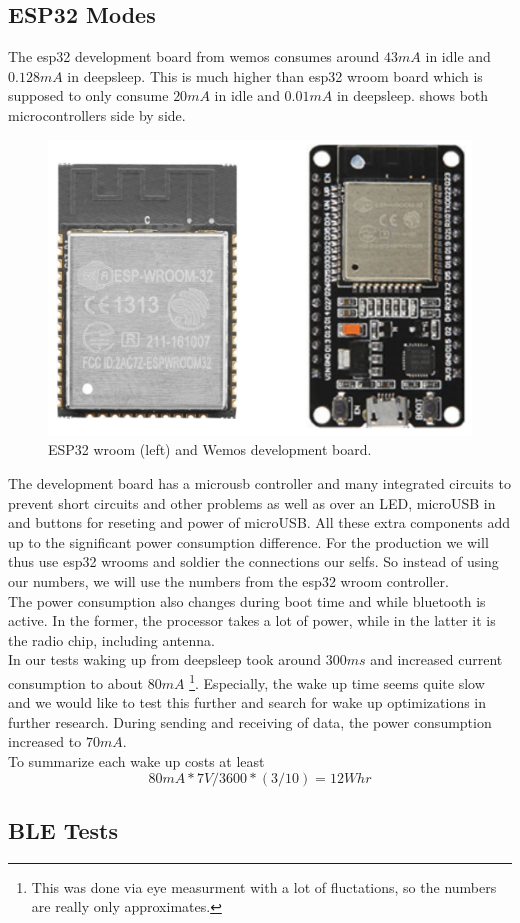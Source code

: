 \subsection{ESP32 Modes}
The esp32 development board from wemos consumes around $43mA$ in idle and $0.128mA$ in deepsleep. This is much higher than esp32 wroom board which is supposed to only consume $20mA$ in idle and $0.01mA$ in deepsleep\cite{InsightI15esp32ModesWroom:online}.  shows both microcontrollers side by side. 

\begin{figure}[H!]
    \centering
    \includegraphics[scale=0.4]{figures/esp32-wroom-wemos.png}%
    \caption{ESP32 wroom (left) and Wemos development board.}\label{fig:esp32Comp}
\end{figure}

The development board has a microusb controller and many integrated circuits to prevent short circuits and other problems as well as over an LED, microUSB in and buttons for reseting and power of microUSB. All these extra components add up to the significant power consumption difference. For the production we will thus use esp32 wrooms and soldier the connections our selfs. So instead of using our numbers, we will use the numbers from the esp32 wroom controller.\\

The power consumption also changes during boot time and while bluetooth is active. In the former, the processor takes a lot of power, while in the latter it is the radio chip, including antenna. \\

In our tests waking up from deepsleep took around $300ms$ and increased current consumption to about $80mA$ \footnote{This was done via eye measurment with a lot of fluctations, so the numbers are really only approximates.}. Especially, the wake up time seems quite slow and we would like to test this further and search for wake up optimizations in further research.
During sending and receiving of data, the power consumption increased to $70mA$.\\

To summarize each wake up costs at least
\begin{equation*}
    80mA * 7V / 3600 * (3/10) = 12Whr
\end{equation*}




\subsection{BLE Tests}